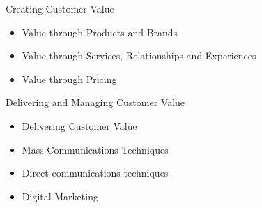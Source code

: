 \documentclass{article}
\begin{document}
Creating Customer Value
\begin{itemize}
    \item Value through Products and Brands
    \item Value through Services, Relationships and Experiences
    \item Value through Pricing
\end{itemize}

Delivering and Managing Customer Value
\begin{itemize}
    \item Delivering Customer Value
    \item Mass Communications Techniques
    \item Direct communications techniques
    \item Digital Marketing
\end{itemize}
\end{document}
